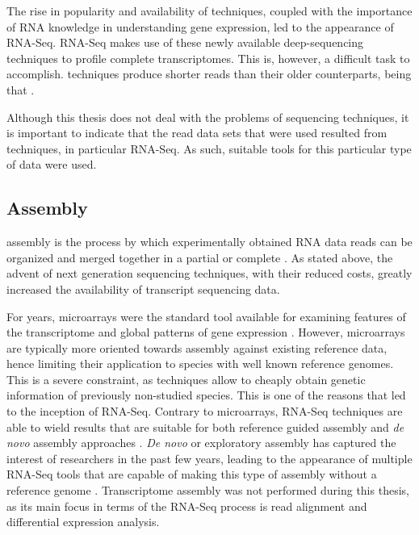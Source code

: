 The rise in popularity and availability of \ngs{} techniques, coupled with the
importance of RNA knowledge in understanding gene expression, led to the
appearance of RNA-Seq. RNA-Seq makes use of these newly available
deep-sequencing techniques to profile complete transcriptomes. This is, however,
a difficult task to accomplish. \ngs{} techniques produce shorter reads than
their older counterparts, being that 
\cite[p. 671]{Martin2011}.

Although this thesis does not deal with the problems of sequencing techniques, it
is important to indicate that the read data sets that were used resulted from
\ngs{} techniques, in particular RNA-Seq. As such, suitable tools for this
particular type of data were used.

\subsection{\Trans{} Assembly}\label{sec:transassembly}


\Trans{} assembly is the process by which experimentally obtained RNA data reads
can be organized and merged together in a partial or complete \trans. As stated
above, the advent of next generation sequencing techniques, with their reduced
costs, greatly increased the availability of transcript sequencing data.

For years, microarrays were the standard tool available for examining features
of the transcriptome and global patterns of gene expression \cite{Wolf2013}.
However, microarrays are typically more oriented towards assembly against
existing reference data, hence limiting their application to species with well
known reference genomes. This is a severe constraint, as \ngs{} techniques allow
to cheaply obtain genetic information of previously non-studied species. This is
one of the reasons that led to the inception of RNA-Seq. Contrary to
microarrays, RNA-Seq techniques are able to wield results that are suitable for
both reference guided assembly and \textit{de novo} assembly approaches
\cite{Wilhelm2009}. \textit{De novo} or exploratory assembly has captured the
interest of researchers in the past few years, leading to the appearance of
multiple RNA-Seq tools that are capable of making this type of assembly without
a reference genome \cite{nuno11:assemblathon}. Transcriptome assembly was not
performed during this thesis, as its main focus in terms of the RNA-Seq process
is read alignment and differential expression analysis.

